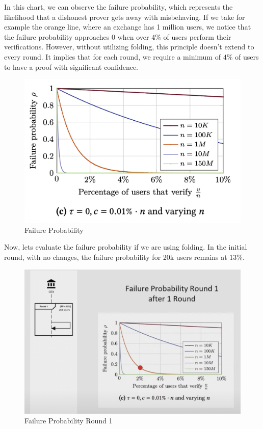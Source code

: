 In this chart, we can observe the failure probability, which represents the likelihood that a dishonest prover gets away with misbehaving.
If we take for example the orange line, where an exchange has 1 million users, we notice that the failure probability approaches 0 when over $4\%$ of users perform their verifications.
However, without utilizing folding, this principle doesn't extend to every round. It implies that for each round, we require a minimum of $4\%$ of users to have a proof with significant confidence.


\begin{figure}[H]
   \centering
   \includegraphics[width=130mm]{FailureProbability.png}
   \caption{Failure Probability \cite{GP21}}
   \label{overflow}
   \end{figure}


Now, lets evaluate the failure probability if we are using folding.
In the initial round, with no changes, the failure probability for 20k users remains at $13\%$.


\begin{figure}[H]
   \centering
   \includegraphics[width=130mm]{FailureProbabilityRound1.png}
   \caption{Failure Probability Round 1 \cite{NS23}}
   \label{overflow}
   \end{figure}


